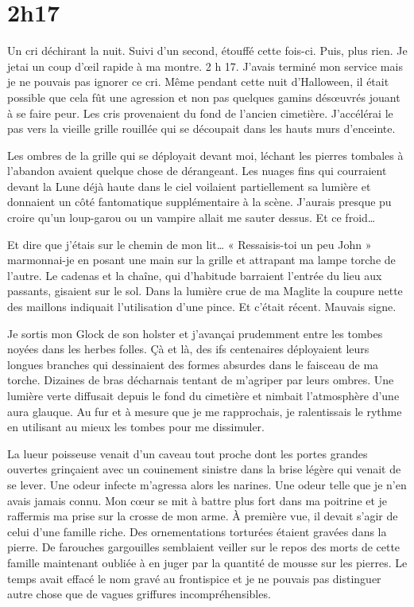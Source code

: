 \chapter[2h17 du matin]{2h17}
Un cri déchirant la nuit. Suivi d'un second, étouffé cette fois-ci. Puis, plus rien. Je jetai un coup d'œil rapide à ma 
montre. 2 h 17. J'avais terminé mon service mais je ne pouvais pas ignorer ce cri. Même pendant cette nuit d'Halloween, 
il était possible que cela fût une agression et non pas quelques gamins désœuvrés jouant à se faire peur. Les cris 
provenaient du fond de l'ancien cimetière. J'accélérai le pas vers la vieille grille rouillée qui se découpait dans les 
hauts murs d'enceinte.

Les ombres de la grille qui se déployait devant moi, léchant les pierres tombales à l'abandon avaient quelque chose de 
dérangeant. Les nuages fins qui courraient devant la Lune déjà haute dans le ciel voilaient partiellement sa lumière et 
donnaient un côté fantomatique supplémentaire à la scène. J'aurais presque pu croire qu'un loup-garou ou un
vampire allait me sauter dessus. Et ce froid\ldots{}

Et dire que j'étais sur le chemin de mon lit\ldots{} « Ressaisis-toi un peu John » marmonnai-je en posant une main sur
la grille et attrapant ma lampe torche de l'autre. Le cadenas et la chaîne, qui d'habitude barraient l'entrée du 
lieu aux passants, gisaient sur le sol. Dans la lumière crue de ma Maglite la coupure nette des maillons indiquait 
l'utilisation d'une pince. Et c'était récent. Mauvais signe.

Je sortis mon Glock de son holster et j'avançai prudemment entre les tombes noyées dans les herbes folles. Çà et là, 
des ifs centenaires déployaient leurs longues branches qui dessinaient des formes absurdes dans le faisceau de ma 
torche. Dizaines de bras décharnais tentant de m'agriper par leurs ombres. Une lumière verte diffusait depuis le fond du cimetière et nimbait l'atmosphère d'une aura glauque. Au fur et à mesure que je me rapprochais, je ralentissais le rythme 
en utilisant au mieux les tombes pour me dissimuler.

La lueur poisseuse venait d'un caveau tout proche dont les portes grandes ouvertes grinçaient avec un couinement 
sinistre dans la brise légère qui venait de se lever. Une odeur infecte m'agressa alors les narines. Une odeur telle 
que je n'en avais jamais connu. Mon cœur se mit à battre plus fort dans ma poitrine et je raffermis ma prise sur la 
crosse de mon arme. À première vue, il devait s'agir de celui d'une famille riche. Des ornementations torturées 
étaient gravées dans la pierre. De farouches gargouilles semblaient veiller sur le repos des morts de cette famille 
maintenant oubliée à en juger par la quantité de mousse sur les pierres. Le temps avait effacé le nom gravé au 
frontispice et je ne pouvais pas distinguer autre chose que de vagues griffures incompréhensibles.

